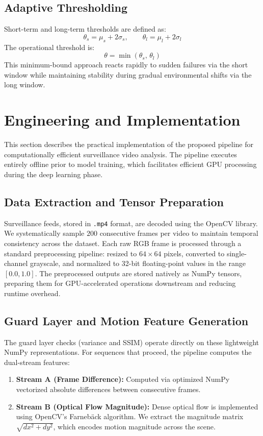 \documentclass[conference]{IEEEtran}
\begin{document}
\subsection{Adaptive Thresholding}
Short-term and long-term thresholds are defined as:
\begin{equation}
\theta_s = \mu_s + 2\sigma_s, \qquad \theta_l = \mu_l + 2\sigma_l
\label{eq:thresh}
\end{equation}
The operational threshold is:
\begin{equation}
\theta = \min(\theta_s,\,\theta_l)
\label{eq:minthresh}
\end{equation}
This minimum-bound approach reacts rapidly to sudden failures via the
short window while maintaining stability during gradual environmental
shifts via the long window.

\section{Engineering and Implementation}
This section describes the practical implementation of the proposed pipeline for computationally efficient surveillance video analysis. The pipeline executes entirely offline prior to model training, which facilitates efficient GPU processing during the deep learning phase.

\subsection{Data Extraction and Tensor Preparation}
Surveillance feeds, stored in \texttt{.mp4} format, are decoded using the OpenCV library. We systematically sample $200$ consecutive frames per video to maintain temporal consistency across the dataset. Each raw RGB frame is processed through a standard preprocessing pipeline: resized to $64\times64$ pixels, converted to single-channel grayscale, and normalized to 32-bit floating-point values in the range $[0.0, 1.0]$. The preprocessed outputs are stored natively as NumPy tensors, preparing them for GPU-accelerated operations downstream and reducing runtime overhead.

\subsection{Guard Layer and Motion Feature Generation}
The guard layer checks (variance and SSIM) operate directly on these lightweight NumPy representations. For sequences that proceed, the pipeline computes the dual-stream features:
\begin{enumerate}
    \item \textbf{Stream A (Frame Difference):} Computed via optimized NumPy vectorized absolute differences between consecutive frames.
    \item \textbf{Stream B (Optical Flow Magnitude):} Dense optical flow is implemented using OpenCV's Farnebäck algorithm. We extract the magnitude matrix $\sqrt{dx^2 + dy^2}$, which encodes motion magnitude across the scene.
\end{enumerate}
\end{document}
